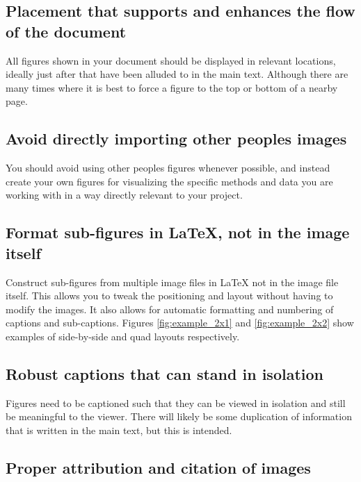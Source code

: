 	\subsection{Placement that supports and enhances the flow of the document}
		All figures shown in your document should be displayed in relevant locations, ideally just after that have been alluded to in the main text. Although there are many times where it is best to force a figure to the top or bottom of a nearby page.
	
	\subsection{Avoid directly importing other peoples images}
		You should avoid using other peoples figures whenever possible, and instead create your own figures for visualizing the specific methods and data you are working with in a way directly relevant to your project. 
	
	\subsection{Format sub-figures in LaTeX, not in the image itself}
		Construct sub-figures from multiple image files in LaTeX not in the image file itself. This allows you to tweak the positioning and layout without having to modify the images. It also allows for automatic formatting and numbering of captions and sub-captions. Figures \ref{fig:example_2x1} and \ref{fig:example_2x2} show examples of side-by-side and quad layouts respectively.
		
		
		
		
	
	\subsection{Robust captions that can stand in isolation}
		Figures need to be captioned such that they can be viewed in isolation and still be meaningful to the viewer. There will likely be some duplication of information that is written in the main text, but this is intended. 
	
	\subsection{Proper attribution and citation of images}
		\label{sec:typesetting_figures_citation}
		

